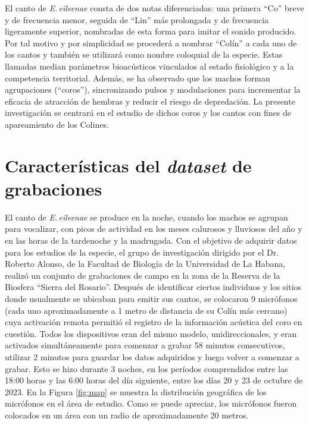 El canto de \emph{E.\,eileenae} consta de dos notas 
diferenciadas: una primera “Co” breve y de frecuencia menor, 
seguida de “Lin” más prolongada y de frecuencia ligeramente 
superior, nombradas de esta forma para imitar el sonido producido. 
Por tal motivo y por simplicidad se procederá a nombrar “Colín” a cada uno de los cantos 
y también se utilizará como nombre coloquial de la especie. 
Estas llamadas median parámetros bioacústicos 
vinculados al estado fisiológico y a la competencia territorial. 
Además, se ha observado que los machos forman agrupaciones 
(“coros”), sincronizando pulsos y modulaciones para incrementar 
la eficacia de atracción de hembras y reducir el riesgo de 
depredación. La presente investigación se centrará en el estudio de dichos
coros y los cantos con fines de apareamiento de los Colines.



\section{Características del \emph{dataset} de grabaciones}

El canto de \emph{E.\,eileenae} se produce en la noche,
cuando los machos se agrupan para vocalizar, 
con picos de actividad en los meses calurosos y lluviosos del año y 
en las horas de la tardenoche y la madrugada.
Con el objetivo de adquirir datos para los estudios de la especie,
el grupo de investigación dirigido por el Dr. Roberto Alonso, de la Facultad de Biología de la Universidad de La Habana,
realizó un conjunto de grabaciones de campo en la zona de la 
Reserva de la Biosfera “Sierra del Rosario”. Después de identificar ciertos
individuos y los sitios donde usualmente se ubicaban para emitir sus cantos, se colocaron
9 micrófonos (cada uno aproximadamente a 1 metro de distancia de su Colín más cercano)
cuya activación remota permitió el registro de la información acústica del coro en cuestión.
Todos los dispositivos eran del mismo modelo, unidireccionales, y eran activados simultáneamente para comenzar a grabar
58 minutos consecutivos, utilizar 2 minutos para guardar los datos adquiridos y luego volver a comenzar a grabar.
Esto se hizo durante 3 noches, en los períodos comprendidos entre las 18:00 horas y las 6:00 horas del día siguiente, entre los días
20 y 23 de octubre de 2023. En la Figura \ref{fig:map} se muestra la distribución geográfica de los micrófonos en el área de estudio.
Como se puede apreciar, los micrófonos fueron colocados en un área con un radio de aproximadamente 20 metros.\\

